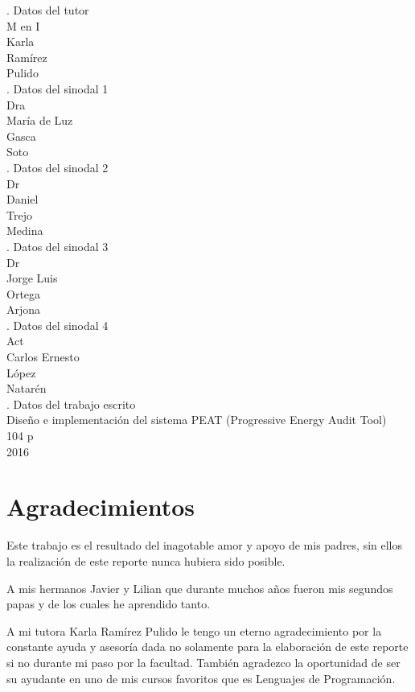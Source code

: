 \documentclass[letterpaper,twoside,openright]{book}
\begin{document}
. Datos del tutor\\
M en I\\
Karla\\
Ramírez\\
Pulido\\

. Datos del sinodal 1\\
Dra\\
María de Luz\\
Gasca\\
Soto\\

. Datos del sinodal 2\\
Dr\\
Daniel\\
Trejo\\
Medina\\

. Datos del sinodal 3\\
Dr\\
Jorge Luis\\
Ortega\\
Arjona\\

. Datos del sinodal 4\\
Act\\
Carlos Ernesto\\
López\\
Natarén\\

. Datos del trabajo escrito\\
Diseño e implementación del sistema PEAT (Progressive Energy Audit Tool)\\
104 p\\
2016\\


\chapter*{Agradecimientos}

Este trabajo es el resultado del inagotable amor y apoyo de mis padres, sin ellos
la realización de este reporte nunca hubiera sido posible.

A mis hermanos Javier y Lilian que durante muchos años fueron mis segundos papas
y de los cuales he aprendido tanto.

A mi tutora Karla Ramírez Pulido le tengo un eterno agradecimiento por la constante
ayuda y asesoría dada no solamente para la elaboración de este reporte si no durante
mi paso por la facultad. También agradezco la oportunidad de ser su ayudante en uno
de mis cursos favoritos que es Lenguajes de Programación.
\end{document}
